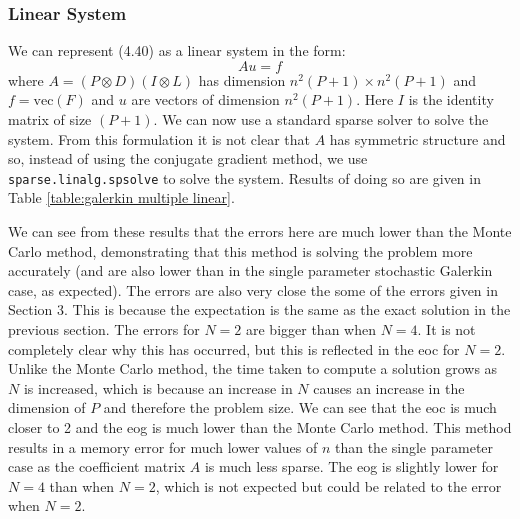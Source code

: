 \documentclass[11pt]{article}
\numberwithin{equation}{section}
\begin{document}
\subsubsection*{Linear System}
We can represent (4.40) as a linear system in the form:
\begin{equation}
Au = f
\end{equation}
where $A=\left( P \otimes D \right) \left( I \otimes L \right)$ has dimension $n^2(P+1) \times n^2(P+1)$ and $f = \text{vec}(F)$ and $u$ are vectors of dimension $n^2(P+1)$. Here $I$ is the identity matrix of size $(P+1)$. We can now use a standard sparse solver to solve the system. From this formulation it is not clear that $A$ has symmetric structure and so, instead of using the conjugate gradient method, we use \texttt{sparse.linalg.spsolve} to solve the system. Results of doing so are given in Table \ref{table:galerkin multiple linear}.

We can see from these results that the errors here are much lower than the Monte Carlo method, demonstrating that this method is solving the problem more accurately (and are also lower than in the single parameter stochastic Galerkin case, as expected). The errors are also very close the some of the errors given in Section 3. This is because the expectation is the same as the exact solution in the previous section. The errors for $N=2$ are bigger than when $N=4$. It is not completely clear why this has occurred, but this is reflected in the eoc for $N=2$. Unlike the Monte Carlo method, the time taken to compute a solution grows as $N$ is increased, which is because an increase in $N$ causes an increase in the dimension of $P$ and therefore the problem size. We can see that the eoc is much closer to 2 and the eog is much lower than the Monte Carlo method. This method results in a memory error for much lower values of $n$ than the single parameter case as the coefficient matrix $A$ is much less sparse. The eog is slightly lower for $N=4$ than when $N=2$, which is not expected but could be related to the error when $N=2$.
\end{document}
